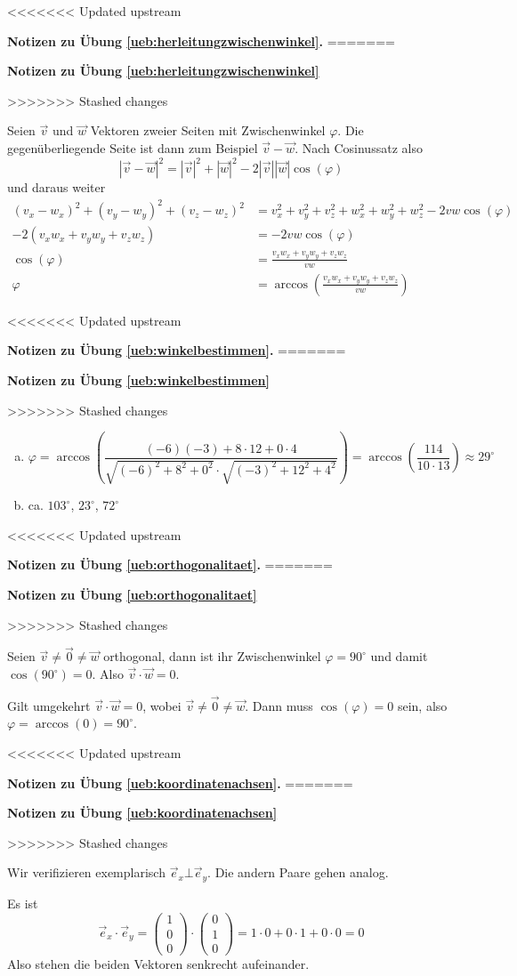 \documentclass[%
11pt,%
twoside,%
titlepage,%
<<<<<<< Updated upstream
german,%
=======
swissgerman,%
>>>>>>> Stashed changes
headsepline%
]{scrartcl}
\newcommand{\faReturnGray}{\textcolor{gray}{\faMailReply}} %
\theoremstyle{definition}
\theoremstyle{plain}
\newcommand{\concatueb}[1]{ueb:#1}%
\newcommand{\concatlsg}[1]{lsg:#1}%
\newenvironment{lsg}[1]{%
<<<<<<< Updated upstream
    \par\noindent\textbf{Notizen zu Übung \ref{\concatueb{#1}}.}%
    \label{\concatlsg{#1}}
=======
    \par\noindent\textbf{Notizen zu Übung \ref{\concatueb{#1}}}\label{\concatlsg{#1}}
    \hfill\hyperref[\concatueb{#1}]{\faReturnGray}\par %
>>>>>>> Stashed changes
}{%
    \par%
}
\begin{document}
\begin{lsg}{herleitungzwischenwinkel}
Seien $\vec{v}$ und $\vec{w}$ Vektoren zweier Seiten mit Zwischenwinkel $\varphi$. Die gegenüberliegende Seite ist dann zum Beispiel $\vec{v}-\vec{w}$. Nach Cosinussatz also
$$|\vec{v}-\vec{w}|^2=|\vec{v}|^2+|\vec{w}|^2-2|\vec{v}||\vec{w}|\cos(\varphi)$$
und daraus weiter
\begin{align*}
    (v_x-w_x)^2+(v_y-w_y)^2+(v_z-w_z)^2 &= v_x^2+v_y^2+v_z^2+w_x^2+w_y^2+w_z^2-2vw\cos(\varphi)\\
    -2(v_xw_x+v_yw_y+v_zw_z) &= -2vw\cos(\varphi)\\
    \cos(\varphi) &= \frac{v_xw_x+v_yw_y+v_zw_z}{vw}\\
    \varphi &= \arccos\left(\frac{v_xw_x+v_yw_y+v_zw_z}{vw}\right)
\end{align*}
\end{lsg}
\begin{lsg}{winkelbestimmen}
\begin{enumerate}[a)]
    \item $$\varphi=\arccos\left(\frac{(-6)(-3)+8\cdot12+0\cdot4}{\sqrt{(-6)^2+8^2+0^2}\cdot\sqrt{(-3)^2+12^2+4^2}}\right)=\arccos\left(\frac{114}{10\cdot13}\right)\approx29^\circ$$
    \item ca. $103^\circ$, $23^\circ$, $72^\circ$
\end{enumerate}
\end{lsg}
\begin{lsg}{orthogonalitaet}
    Seien $\vec{v}\neq\vec{0}\neq\vec{w}$ orthogonal, dann ist ihr Zwischenwinkel $\varphi=90^\circ$ und damit $\cos(90^\circ)=0$. Also $\vec{v}\cdot\vec{w}=0$.

    Gilt umgekehrt $\vec{v}\cdot\vec{w}=0$, wobei $\vec{v}\neq\vec{0}\neq\vec{w}$. Dann muss $\cos(\varphi)=0$ sein, also $\varphi=\arccos(0)=90^\circ$.
\end{lsg}
\begin{lsg}{koordinatenachsen}
Wir verifizieren exemplarisch $\vec{e}_x\bot\vec{e}_y$. Die andern Paare gehen analog.

Es ist
$$\vec{e}_x\cdot\vec{e}_y=\begin{pmatrix}
    1\\0\\0
\end{pmatrix}\cdot\begin{pmatrix}
    0\\1\\0
\end{pmatrix}=1\cdot0+0\cdot1+0\cdot0=0$$
Also stehen die beiden Vektoren senkrecht aufeinander.
\end{lsg}
\end{document}

